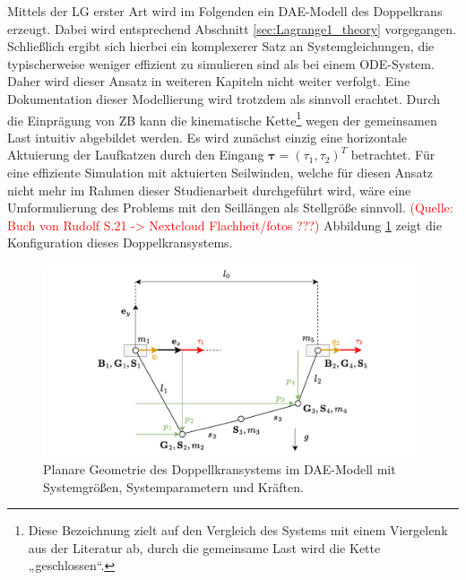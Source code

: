 Mittels der LG erster Art wird im Folgenden ein DAE-Modell des Doppelkrans erzeugt. Dabei wird entsprechend Abschnitt \ref{sec:Lagrange1_theory} vorgegangen. Schließlich ergibt sich hierbei ein komplexerer Satz an Systemgleichungen, die typischerweise weniger effizient zu simulieren sind als bei einem ODE-System. Daher wird dieser Ansatz in weiteren Kapiteln nicht weiter verfolgt. Eine Dokumentation dieser Modellierung wird trotzdem als sinnvoll erachtet. Durch die Einprägung von ZB kann die kinematische Kette\footnote{Diese Bezeichnung zielt auf den Vergleich des Systems mit einem Viergelenk aus der Literatur ab, durch die gemeinsame Last wird die Kette „geschlossen“.} wegen der gemeinsamen Last intuitiv abgebildet werden. Es wird zunächst einzig eine horizontale Aktuierung der Laufkatzen durch den Eingang $\boldsymbol{\tau} = (\tau_{1}, \tau_{2})^T$ betrachtet. Für eine effiziente Simulation mit aktuierten Seilwinden, welche für diesen Ansatz nicht mehr im Rahmen dieser Studienarbeit durchgeführt wird, wäre eine Umformulierung des Problems mit den Seillängen als Stellgröße sinnvoll. \textcolor{red}{(Quelle: Buch von Rudolf S.21 -> Nextcloud Flachheit/fotos ???)} Abbildung \ref{fig:DAE_double_crane_diagram} zeigt die Konfiguration dieses Doppelkransystems.

\begin{figure}[ht]
	\begin{center}
		\includegraphics[scale=1]{Pictures/DAE_double_crane_cartesian_diagram.pdf}
	\end{center}
	\caption[Planare Geometrie des Doppellkransystems im DAE-Modell]
	{Planare Geometrie des Doppellkransystems im DAE-Modell mit Systemgrößen, Systemparametern und Kräften.}
	\label{fig:DAE_double_crane_diagram}
\end{figure}

